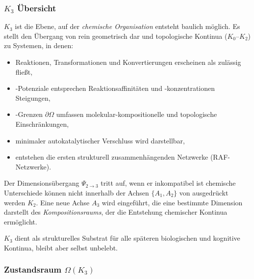 

\subsubsection{\texorpdfstring{$K_3$}{K_3} Übersicht}
\label{sec:k3-overview}

$K_3$ ist die Ebene, auf der \emph{chemische Organisation} entsteht
baulich möglich. Es stellt den Übergang von rein geometrisch dar
und topologische Kontinua ($K_0$--$K_2$) zu Systemen, in denen:
\begin{itemize}
    \item Reaktionen, Transformationen und Konvertierungen erscheinen als zulässig
          fließt,
    \item-Potenziale entsprechen Reaktionsaffinitäten und -konzentrationen
          Steigungen,
    \item-Grenzen $\partial\Omega$ umfassen molekular-kompositionelle und
          topologische Einschränkungen,
    \item minimaler autokatalytischer Verschluss wird darstellbar,
    \item entstehen die ersten strukturell zusammenhängenden Netzwerke (RAF-Netzwerke).
\end{itemize}

Der Dimensionsübergang $\Psi_{2\to3}$ tritt auf, wenn er inkompatibel ist
chemische Unterschiede können nicht innerhalb der Achsen $\{A_1,A_2\}$ von ausgedrückt werden
$K_2$. Eine neue Achse $A_3$ wird eingeführt, die eine bestimmte Dimension darstellt
des \emph{Kompositionsraums}, der die Entstehung chemischer Kontinua ermöglicht.

$K_3$ dient als strukturelles Substrat für alle späteren biologischen und
kognitive Kontinua, bleibt aber selbst unbelebt.

\subsubsection{Zustandsraum \texorpdfstring{$\Omega(K_3)$}{\Omega(K_3)}}

